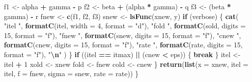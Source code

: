 \documentclass[
  12pt,
]{article}
\newenvironment{Shaded}{\begin{snugshade}}{\end{snugshade}}
\newcommand{\AttributeTok}[1]{\textcolor[rgb]{0.13,0.29,0.53}{#1}}
\newcommand{\ControlFlowTok}[1]{\textcolor[rgb]{0.13,0.29,0.53}{\textbf{#1}}}
\newcommand{\DecValTok}[1]{\textcolor[rgb]{0.00,0.00,0.81}{#1}}
\newcommand{\FunctionTok}[1]{\textcolor[rgb]{0.13,0.29,0.53}{\textbf{#1}}}
\newcommand{\NormalTok}[1]{#1}
\newcommand{\OtherTok}[1]{\textcolor[rgb]{0.56,0.35,0.01}{#1}}
\newcommand{\SpecialCharTok}[1]{\textcolor[rgb]{0.81,0.36,0.00}{\textbf{#1}}}
\newcommand{\StringTok}[1]{\textcolor[rgb]{0.31,0.60,0.02}{#1}}
\begin{document}
\begin{Shaded}
\begin{Highlighting}[]
\NormalTok{    f1 }\OtherTok{\textless{}{-}}\NormalTok{ alpha }\SpecialCharTok{+}\NormalTok{ gamma }\SpecialCharTok{{-}}\NormalTok{ p}
\NormalTok{    f2 }\OtherTok{\textless{}{-}}\NormalTok{ beta }\SpecialCharTok{+}\NormalTok{ (alpha }\SpecialCharTok{*}\NormalTok{ gamma) }\SpecialCharTok{{-}}\NormalTok{ q}
\NormalTok{    f3 }\OtherTok{\textless{}{-}}\NormalTok{ (beta }\SpecialCharTok{*}\NormalTok{ gamma) }\SpecialCharTok{{-}}\NormalTok{ r}
\NormalTok{    fnew }\OtherTok{\textless{}{-}} \FunctionTok{c}\NormalTok{(f1, f2, f3)}
\NormalTok{    snew }\OtherTok{\textless{}{-}} \FunctionTok{lsFunc}\NormalTok{(xnew, y)}
    \ControlFlowTok{if}\NormalTok{ (verbose) \{}
      \FunctionTok{cat}\NormalTok{(}
        \StringTok{"itel "}\NormalTok{,}
        \FunctionTok{formatC}\NormalTok{(itel, }\AttributeTok{width =} \DecValTok{4}\NormalTok{, }\AttributeTok{format =} \StringTok{"d"}\NormalTok{),}
        \StringTok{"fold "}\NormalTok{,}
        \FunctionTok{formatC}\NormalTok{(sold, }\AttributeTok{digits =} \DecValTok{15}\NormalTok{, }\AttributeTok{format =} \StringTok{"f"}\NormalTok{),}
        \StringTok{"fnew "}\NormalTok{,}
        \FunctionTok{formatC}\NormalTok{(snew, }\AttributeTok{digits =} \DecValTok{15}\NormalTok{, }\AttributeTok{format =} \StringTok{"f"}\NormalTok{),}
        \StringTok{"cnew "}\NormalTok{,}
        \FunctionTok{formatC}\NormalTok{(cnew, }\AttributeTok{digits =} \DecValTok{15}\NormalTok{, }\AttributeTok{format =} \StringTok{"f"}\NormalTok{),}
        \StringTok{"rate "}\NormalTok{,}
        \FunctionTok{formatC}\NormalTok{(rate, }\AttributeTok{digits =} \DecValTok{15}\NormalTok{, }\AttributeTok{format =} \StringTok{"f"}\NormalTok{),}
        \StringTok{"}\SpecialCharTok{\textbackslash{}n}\StringTok{"}
\NormalTok{      )}
\NormalTok{    \}}
    \ControlFlowTok{if}\NormalTok{ ((itel }\SpecialCharTok{==}\NormalTok{ itmax) }\SpecialCharTok{||}\NormalTok{ (cnew }\SpecialCharTok{\textless{}}\NormalTok{ eps)) \{}
      \ControlFlowTok{break}
\NormalTok{    \}}
\NormalTok{    itel }\OtherTok{\textless{}{-}}\NormalTok{ itel }\SpecialCharTok{+} \DecValTok{1}
\NormalTok{    xold }\OtherTok{\textless{}{-}}\NormalTok{ xnew}
\NormalTok{    fold }\OtherTok{\textless{}{-}}\NormalTok{ fnew}
\NormalTok{    cold }\OtherTok{\textless{}{-}}\NormalTok{ cnew}
\NormalTok{  \}}
  \FunctionTok{return}\NormalTok{(}\FunctionTok{list}\NormalTok{(}\AttributeTok{x =}\NormalTok{ xnew, }\AttributeTok{itel =}\NormalTok{ itel, }\AttributeTok{f =}\NormalTok{ fnew, }\AttributeTok{sigma =}\NormalTok{ snew, }\AttributeTok{rate =}\NormalTok{ rate))}
\NormalTok{\}}


\end{Highlighting}
\end{Shaded}
\end{document}
